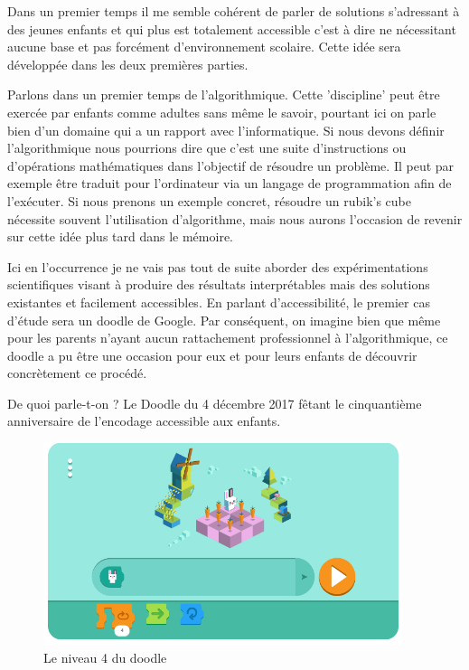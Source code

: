 Dans un premier temps il me semble cohérent de parler de solutions s'adressant à des jeunes enfants et qui plus est totalement accessible c'est à dire ne nécessitant aucune base et pas forcément d'environnement scolaire. Cette idée sera développée dans les deux premières parties. 

Parlons dans un premier temps de l'algorithmique. Cette 'discipline' peut être exercée par enfants comme adultes sans même le savoir, pourtant ici on parle bien d'un domaine qui a un rapport avec l'informatique. Si nous devons définir l'algorithmique nous pourrions dire que c'est une suite d'instructions ou d'opérations mathématiques dans l'objectif de résoudre un problème. Il peut par exemple être traduit pour l'ordinateur via un langage de programmation afin de l'exécuter. Si nous prenons un exemple concret, résoudre un rubik's cube nécessite souvent l'utilisation d'algorithme, mais nous aurons l'occasion de revenir sur cette idée plus tard dans le mémoire. 

Ici en l'occurrence je ne vais pas tout de suite aborder des expérimentations scientifiques visant à produire des résultats interprétables mais des solutions existantes et facilement accessibles. En parlant d'accessibilité, le premier cas d'étude sera un doodle de Google. Par conséquent, on imagine bien que même pour les parents n'ayant aucun rattachement professionnel à l'algorithmique, ce doodle a pu être une occasion pour eux et pour leurs enfants de découvrir concrètement ce procédé.

De quoi parle-t-on ? Le Doodle du 4 décembre 2017 fêtant le cinquantième anniversaire de l'encodage accessible aux enfants. \cite{10} \cite{11}

\begin{figure}[!htb]
  \centering
  \includegraphics[width=105mm,scale=0.5]{images/nosoluce.PNG}
  \caption{Le niveau 4 du doodle}
  \label{fig:boat1}
\end{figure}


